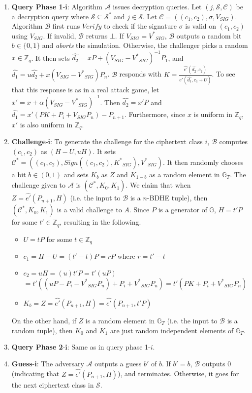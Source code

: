 \begin{enumerate}
 \item \textbf{Query Phase 1}-$\mathbf{i}$: Algorithm $\mathcal{A}$ issues decryption queries. Let $(j,\mathcal{S},\mathcal{C})$ be a decryption query where $\mathcal{S}\subseteq{\mathcal{S}}^{*}$ and $j\in\mathcal{S}$. Let $\mathcal{C}=((c_1,c_2),\sigma,V_{SIG})$. Algorithm $\mathcal{B}$ first runs $Verify$ to check if the signature $\sigma$ is valid on $(c_1,c_2)$ using $V_{SIG}$. If invalid, $\mathcal{B}$ returns $\bot$. If $V_{SIG} = {V^{*}}_{SIG}$, $\mathcal{B}$ outputs a random bit $b\in\{0,1\}$ and \emph{aborts} the simulation. Otherwise, the challenger picks a random $x\in\mathbb{Z}_q$. It then sets $\hat{d_2}=xP+{(V_{SIG}-{V^{*}}_{SIG})}^{-1}P_1$, and $\hat{d_1}=u\hat{d_2}+x(V_{SIG}-{V^{*}}_{SIG})P_n$. $\mathcal{B}$ responds with $K=\frac{\hat{e'}(\hat{d_2},c_2)}{\hat{e'}(\hat{d_1},c_1 + U)}$. To see that this response is as in a real attack game, let $x'=x+\alpha{(V_{SIG}-{V^{*}}_{SIG})}^{-1}$. Then $\hat{d_2}=x'P$ and $\hat{d_1}=x'(PK+P_i+V_{SIG}P_n)-P_{n+1}$. Furthermore, since $x$ is uniform in $\mathbb{Z}_q$, $x'$ is also uniform in $\mathbb{Z}_q$. 
 
 \item \textbf{Challenge}-$\mathbf{i}$: To generate the challenge for the ciphertext class $i$, $\mathcal{B}$ computes $(c_1,c_2)$ as $(H-U,uH)$. It sets ${\mathcal{C}}^{*}=((c_1,c_2),Sign((c_1,c_2),{K^{*}}_{SIG}),{V^{*}}_{SIG})$. It then randomly chooses a bit $b\in{(0,1)}$ and sets $K_b$ as $Z$ and $K_{1-b}$ as a random element in $\mathbb{G}_T$. The challenge given to $\mathcal{A}$ is $({\mathcal{C}}^{*},K_0,K_1)$.  We claim that when $Z=\hat{e'}(P_{n+1},H)$ (i.e. the input to $\mathcal{B}$ is a $n$-BDHE tuple), then $({\mathcal{C}}^{*},K_0,K_1)$ is a valid challenge to $A$. Since $P$ is a generator of $\mathbb{G}$, $H=t'P$ for some $t'\in\mathbb{Z}_q$, resulting in the following.

 \begin{itemize}
  \item $U=tP$ for some $t\in\mathbb{Z}_q$
  \item $c_1=H-U=(t'-t)P=rP$ where $r=t'-t$
  \item $c_2=uH=(u)t'P=t'(uP)$\\$=t'((uP-{P_i}-{V^{*}}_{SIG}P_n)+P_i+{V^{*}}_{SIG}P_n)=t'(PK+P_i+{V^{*}}_{SIG}P_n)$
  \item $K_b=Z=\hat{e'}(P_{n+1},H)=\hat{e'}(P_{n+1},t'P)$
 \end{itemize}
 On the other hand, if $Z$ is a random element in $\mathbb{G}_T$ (i.e. the input to $\mathcal{B}$ is a random tuple), then $K_0$ and $K_1$ are just random independent elements of $\mathbb{G}_T$.
 
 \item\textbf{Query Phase 2}-$\mathbf{i}$: Same as in query phase 1-${i}$.
 
 \item\textbf{Guess}-$\mathbf{i}$: The adversary $\mathcal{A}$ outputs a guess $b'$ of $b$. If $b' = b$, $\mathcal{B}$ outputs $0$ (indicating that $Z = \hat{e'}(P_{n+1},H)$), and terminates. Otherwise, it goes for the next ciphertext class in $\mathcal{S}$.
\end{enumerate}


